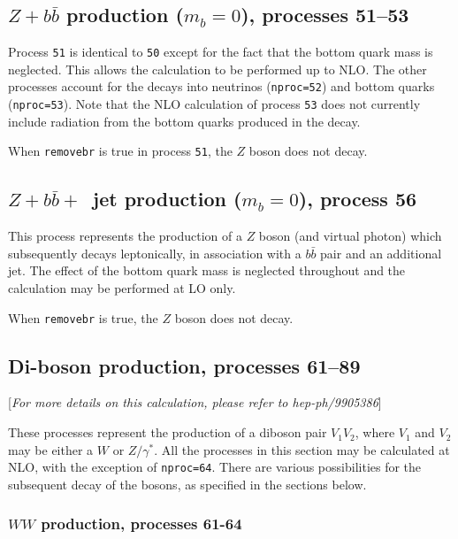 \documentclass[12pt]{article}
\begin{document}
\subsection{$Z+b{\bar b}$ production ($m_b=0$), processes 51--53}
\label{subsec:zbbmassless}

Process {\tt 51} is identical to {\tt 50} except for the fact
that the bottom quark mass is neglected. This allows the calculation to be
performed up to NLO. The other processes account for the decays into
neutrinos ({\tt nproc=52}) and bottom quarks ({\tt nproc=53}). Note that
the NLO calculation of process {\tt 53} does not currently 
include radiation from the
bottom quarks produced in the decay.

When {\tt removebr} is true in process {\tt 51}, the $Z$ boson does not decay.

\subsection{$Z+b{\bar b}+$~jet production ($m_b=0$), process 56}
\label{subsec:zbbjetmassless}

This process represents the production of a $Z$ boson (and virtual photon)
which subsequently decays leptonically, in association
with a $b{\bar b}$ pair and an additional jet.
The effect of the bottom quark mass is neglected throughout
and the calculation may be performed at LO only.

When {\tt removebr} is true, the $Z$ boson does not decay.

\subsection{Di-boson production, processes 61--89}
\label{subsec:diboson}

\begin{center}
[{\it For more details on this calculation, please refer to hep-ph/9905386}]
\end{center}

These processes represent the production of a diboson pair $V_1 V_2$,
where $V_1$ and $V_2$ may be either a $W$ or $Z/\gamma^*$. 
All the processes in this section may be calculated at NLO, with the exception
of {\tt nproc=64}. There are various
possibilities for the subsequent decay of the bosons, as specified in the
sections below.

\subsubsection{$WW$ production, processes 61-64}
\end{document}
